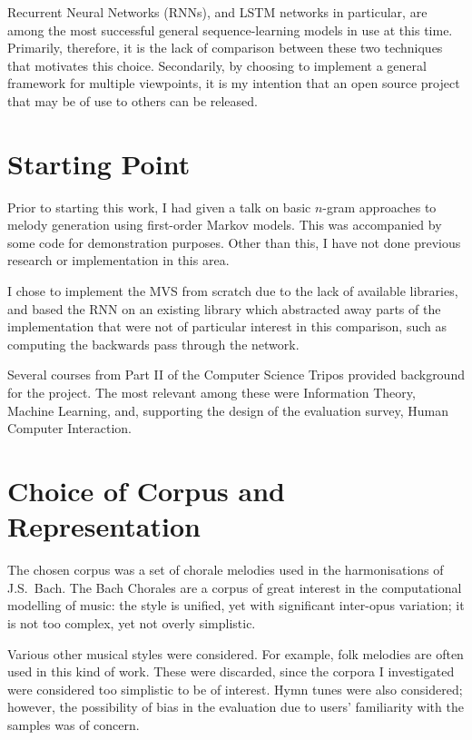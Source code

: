 \documentclass[12pt,a4paper,twoside,openright]{report}
\begin{document}
Recurrent Neural Networks (RNNs), and LSTM networks in particular, are among the
most successful general sequence-learning models in use at this time. Primarily,
therefore, it is the lack of comparison between these two techniques that
motivates this choice. Secondarily, by choosing to implement a general framework
for multiple viewpoints, it is my intention that an open source project that may
be of use to others can be released.

\section{Starting Point}

Prior to starting this work, I had given a talk on basic $n$-gram approaches to
melody generation using first-order Markov models. This was accompanied by some
code for demonstration purposes. Other than this, I have not done previous
research or implementation in this area. 

I chose to implement the MVS from scratch due to the lack of available
libraries, and based the RNN on an existing library which abstracted away parts
of the implementation that were not of particular interest in this comparison,
such as computing the backwards pass through the network.

Several courses from Part II of the Computer Science Tripos provided background
for the project. The most relevant among these were Information Theory, Machine
Learning, and, supporting the design of the evaluation survey, Human Computer
Interaction. 

\section{Choice of Corpus and Representation}\label{sec:corp-rep}

The chosen corpus was a set of chorale melodies used in the harmonisations of
J.S.\ Bach. The Bach Chorales are a corpus of great interest in the
computational modelling of music: the style is unified, yet with significant
inter-opus variation; it is not too complex, yet not overly simplistic.

Various other musical styles were considered. For example, folk melodies are
often used in this kind of work. These were discarded, since the corpora I
investigated were considered too simplistic to be of interest. Hymn tunes were
also considered; however, the possibility of bias in the evaluation due to
users' familiarity with the samples was of concern.
\end{document}
